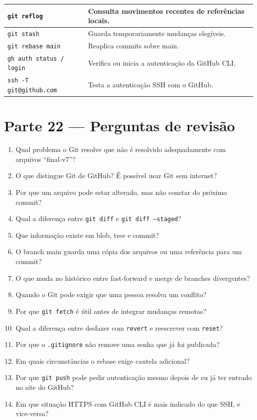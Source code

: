 \documentclass[11pt,a4paper]{article}
\begin{document}
\begin{center}
\begin{longtable}{|p{5.3cm}|p{8.2cm}|}
\texttt{git reflog} & Consulta movimentos recentes de referências locais. \\ \hline
\texttt{git stash} & Guarda temporariamente mudanças elegíveis. \\ \hline
\texttt{git rebase main} & Reaplica commits sobre main. \\ \hline
\texttt{gh auth status / login} & Verifica ou inicia a autenticação da GitHub CLI. \\ \hline
\texttt{ssh -T git@github.com} & Testa a autenticação SSH com o GitHub. \\ \hline
\end{longtable}
\end{center}

\section*{Parte 22 --- Perguntas de revisão}
\begin{enumerate}
\item Qual problema o Git resolve que não é resolvido adequadamente com arquivos ``final-v7''?
\item O que distingue Git de GitHub? É possível usar Git sem internet?
\item Por que um arquivo pode estar alterado, mas não constar do próximo commit?
\item Qual a diferença entre \texttt{git diff} e \texttt{git diff --staged}?
\item Que informação existe em blob, tree e commit?
\item O branch main guarda uma cópia dos arquivos ou uma referência para um commit?
\item O que muda no histórico entre fast-forward e merge de branches divergentes?
\item Quando o Git pode exigir que uma pessoa resolva um conflito?
\item Por que \texttt{git fetch} é útil antes de integrar mudanças remotas?
\item Qual a diferença entre desfazer com \texttt{revert} e reescrever com \texttt{reset}?
\item Por que o \texttt{.gitignore} não remove uma senha que já foi publicada?
\item Em quais circunstâncias o rebase exige cautela adicional?
\item Por que \texttt{git push} pode pedir autenticação mesmo depois de eu já ter entrado no site do GitHub?
\item Em que situação HTTPS com GitHub CLI é mais indicado do que SSH, e vice-versa?
\end{enumerate}
\end{document}
